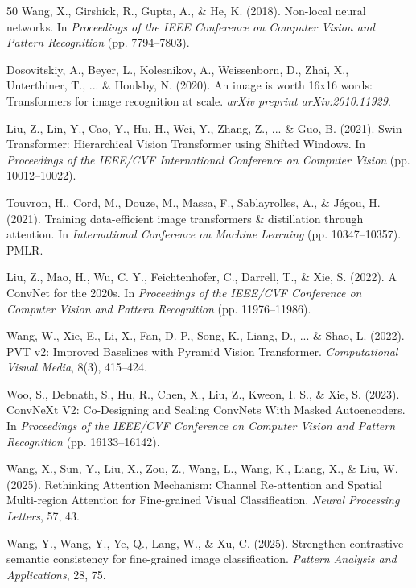 \documentclass[pdflatex,iicol,sn-mathphys-num]{sn-jnl}
\theoremstyle{thmstyleone}%
\theoremstyle{thmstyletwo}%
\theoremstyle{thmstylethree}%
\begin{document}
{\begin{thebibliography}{50}
     Wang, X., Girshick, R., Gupta, A., \& He, K. (2018). Non-local neural networks. In \textit{Proceedings of the IEEE Conference on Computer Vision and Pattern Recognition} (pp. 7794--7803).
    
     Dosovitskiy, A., Beyer, L., Kolesnikov, A., Weissenborn, D., Zhai, X., Unterthiner, T., ... \& Houlsby, N. (2020). An image is worth 16x16 words: Transformers for image recognition at scale. \textit{arXiv preprint arXiv:2010.11929}.
    
     Liu, Z., Lin, Y., Cao, Y., Hu, H., Wei, Y., Zhang, Z., ... \& Guo, B. (2021). Swin Transformer: Hierarchical Vision Transformer using Shifted Windows. In \textit{Proceedings of the IEEE/CVF International Conference on Computer Vision} (pp. 10012--10022).
    
     Touvron, H., Cord, M., Douze, M., Massa, F., Sablayrolles, A., \& Jégou, H. (2021). Training data-efficient image transformers \& distillation through attention. In \textit{International Conference on Machine Learning} (pp. 10347--10357). PMLR.
    
     Liu, Z., Mao, H., Wu, C. Y., Feichtenhofer, C., Darrell, T., \& Xie, S. (2022). A ConvNet for the 2020s. In \textit{Proceedings of the IEEE/CVF Conference on Computer Vision and Pattern Recognition} (pp. 11976--11986).
    
     Wang, W., Xie, E., Li, X., Fan, D. P., Song, K., Liang, D., ... \& Shao, L. (2022). PVT v2: Improved Baselines with Pyramid Vision Transformer. \textit{Computational Visual Media}, 8(3), 415--424.
    
     Woo, S., Debnath, S., Hu, R., Chen, X., Liu, Z., Kweon, I. S., \& Xie, S. (2023). ConvNeXt V2: Co-Designing and Scaling ConvNets With Masked Autoencoders. In \textit{Proceedings of the IEEE/CVF Conference on Computer Vision and Pattern Recognition} (pp. 16133--16142).
    
     Wang, X., Sun, Y., Liu, X., Zou, Z., Wang, L., Wang, K., Liang, X., \& Liu, W. (2025). Rethinking Attention Mechanism: Channel Re-attention and Spatial Multi-region Attention for Fine-grained Visual Classification. \textit{Neural Processing Letters}, 57, 43.
    
     Wang, Y., Wang, Y., Ye, Q., Lang, W., \& Xu, C. (2025). Strengthen contrastive semantic consistency for fine-grained image classification. \textit{Pattern Analysis and Applications}, 28, 75.
    

\end{thebibliography}}
\end{document}
